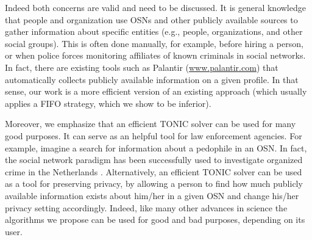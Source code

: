 \documentclass[prodmode,acmtecs]{acmsmall} %
\begin{document}
Indeed both concerns are valid and need to be discussed. It is general knowledge that people and organization use OSNs and other publicly available sources to gather information about specific entities (e.g., people, organizations, and other social groups). This is often done manually, for example, before hiring a person, 
or when police forces monitoring affiliates of known criminals in social networks. 
In fact, there are existing tools such as Palantir (\url{www.palantir.com}) that automatically collects publicly available information on a given profile. In that sense, our work is a more efficient version of an existing approach (which usually applies a FIFO strategy, which we show to be inferior). 


Moreover, we emphasize that an efficient TONIC solver can be used for many good purposes. It can serve as an helpful tool for law enforcement agencies. For example, imagine a search for information about a pedophile in an OSN. In fact, the social network paradigm has been successfully used to investigate organized crime in the Netherlands \cite{klerks2001network}. Alternatively, an efficient TONIC solver can be used as a tool for preserving privacy, by allowing a person to find how much publicly available information exists about him/her in a given OSN and change his/her privacy setting accordingly. 
Indeed, like many other advances in science the algorithms we propose can be used for good and bad purposes, depending on its user. 






 
\end{document}
